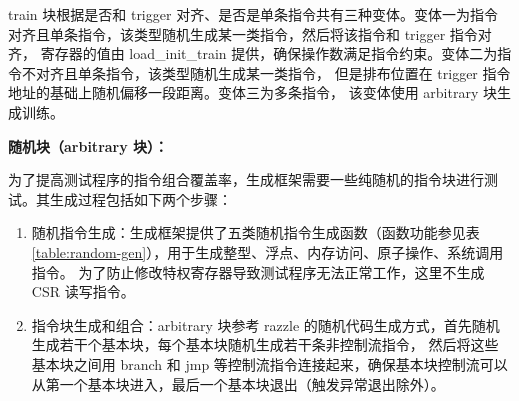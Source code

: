 train 块根据是否和 trigger 对齐、是否是单条指令共有三种变体。变体一为指令对齐且单条指令，该类型随机生成某一类指令，然后将该指令和 trigger 指令对齐，
寄存器的值由 load\_init\_train 提供，确保操作数满足指令约束。变体二为指令不对齐且单条指令，该类型随机生成某一类指令，
但是排布位置在 trigger 指令地址的基础上随机偏移一段距离。变体三为多条指令，
该变体使用 arbitrary 块生成训练。\par

\textbf{随机块（arbitrary 块）：}\par
为了提高测试程序的指令组合覆盖率，生成框架需要一些纯随机的指令块进行测试。其生成过程包括如下两个步骤：
\begin{enumerate}
    \item 随机指令生成：生成框架提供了五类随机指令生成函数（函数功能参见表\ref{table:random-gen}），用于生成整型、浮点、内存访问、原子操作、系统调用指令。
为了防止修改特权寄存器导致测试程序无法正常工作，这里不生成 CSR 读写指令。\par
    \item 指令块生成和组合：arbitrary 块参考 razzle 的随机代码生成方式，首先随机生成若干个基本块，每个基本块随机生成若干条非控制流指令，
    然后将这些基本块之间用 branch 和 jmp 等控制流指令连接起来，确保基本块控制流可以从第一个基本块进入，最后一个基本块退出（触发异常退出除外）。
\end{enumerate}

\begin{table}[h!]
    \begin{center} 
    \caption{随机指令生成} 
    \label{table:random-gen}  
    \end{center}
\end{table}

